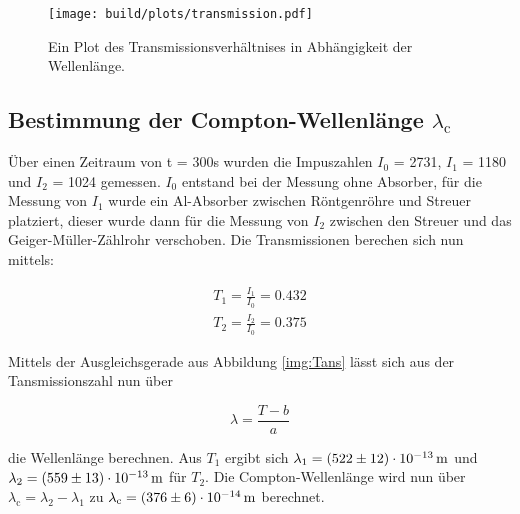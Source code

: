             \begin{figure}
                \centering
                \texttt{[image: build/plots/transmission.pdf]}
                \caption{Ein Plot des Transmissionsverhältnises in Abhängigkeit der Wellenlänge.}
                \label{img:Trans}
            \end{figure}

    \subsection{Bestimmung der Compton-Wellenlänge \texorpdfstring{$\lambda_{\text{c}}$}{TEXT}}

        \noindent Über einen Zeitraum von t = 300s wurden die Impuszahlen $I_0$ = 2731, $I_1$ = 1180 und $I_2$ = 1024 gemessen.
        $I_0$ entstand bei der Messung ohne Absorber, für die Messung von $I_1$ wurde ein Al-Absorber zwischen Röntgenröhre und 
        Streuer platziert, dieser wurde dann für die Messung von $I_2$ zwischen den Streuer und das Geiger-Müller-Zählrohr verschoben.
        Die Transmissionen berechen sich nun mittels:

            \begin{align}
                T_1 = \frac{I_1}{I_0} = 0.432   \nonumber\\
                T_2 = \frac{I_2}{I_0} = 0.375   \nonumber
            \end{align}

        \noindent Mittels der Ausgleichsgerade aus Abbildung \ref{img:Tans} lässt sich aus der Tansmissionszahl nun über 
            
            \begin{equation*}
                \lambda = \frac{T - b}{a}
            \end{equation*}

        \noindent die Wellenlänge berechnen. Aus $T_1$ ergibt sich $\lambda_1 = \SI{522 (12)e-13}{\meter}$ und $\lambda_2 = 
        \SI{559  (13)e-13}{\meter}$ für $T_2$. Die Compton-Wellenlänge wird nun über $\lambda_{\text{c}} = \lambda_2 - \lambda_1$ zu 
        $\lambda_{\text{c}} = \SI{376 (6) e-14}{\meter}$ berechnet.

            

    


    